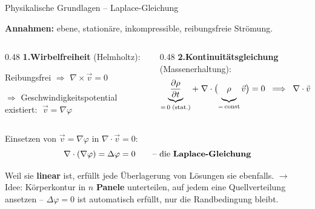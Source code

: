 \documentclass[aspectratio=169]{beamer}
\begin{document}
\begin{frame}{Physikalische Grundlagen -- Laplace-Gleichung}
\footnotesize

\textbf{Annahmen:} ebene, stationäre, inkompressible, reibungsfreie Strömung.

\medskip
\begin{columns}[T]
\begin{column}{0.48\textwidth}
\textbf{1.\;Wirbelfreiheit} (Helmholtz):

\smallskip
Reibungsfrei $\Rightarrow$ $\nabla\times\vec{v}=0$

$\Rightarrow$ Geschwindigkeitspotential existiert: $\;\vec{v} = \nabla\varphi$
\end{column}
\begin{column}{0.48\textwidth}
\textbf{2.\;Kontinuitätsgleichung} (Massenerhaltung):
\vspace{-1mm}
\[
  \underbrace{\frac{\partial\rho}{\partial t}}_{=\,0\;\text{(stat.)}}
  +\;\nabla\cdot\bigl(\underbrace{\rho\vphantom{\frac{\partial}{\partial t}}}_{=\,\text{const}}\vec{v}\bigr) = 0
  \;\;\Longrightarrow\;\;
  \nabla\cdot\vec{v} = 0
\]
\end{column}
\end{columns}

\medskip
Einsetzen von $\vec{v}=\nabla\varphi$ in $\nabla\cdot\vec{v}=0$:
\vspace{-1mm}
\[
  \nabla\cdot(\nabla\varphi) = \Delta\varphi = 0
  \qquad\text{-- die \textbf{Laplace-Gleichung}}
\]

\vspace{-2mm}
Weil sie \textbf{linear} ist, erfüllt jede Überlagerung von Lösungen sie ebenfalls.
$\to$ Idee: Körperkontur in $n$ \textbf{Panele} unterteilen, auf jedem eine Quellverteilung
ansetzen -- $\Delta\varphi=0$ ist automatisch erfüllt, nur die Randbedingung bleibt.

\end{frame}
\end{document}
